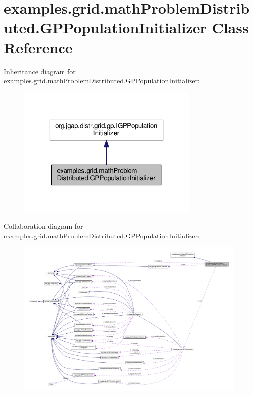 \hypertarget{classexamples_1_1grid_1_1math_problem_distributed_1_1_g_p_population_initializer}{\section{examples.\-grid.\-math\-Problem\-Distributed.\-G\-P\-Population\-Initializer Class Reference}
\label{classexamples_1_1grid_1_1math_problem_distributed_1_1_g_p_population_initializer}
}


Inheritance diagram for examples.\-grid.\-math\-Problem\-Distributed.\-G\-P\-Population\-Initializer\-:
\nopagebreak
\begin{figure}[H]
\begin{center}
\leavevmode
\includegraphics[width=250pt]{classexamples_1_1grid_1_1math_problem_distributed_1_1_g_p_population_initializer__inherit__graph}
\end{center}
\end{figure}


Collaboration diagram for examples.\-grid.\-math\-Problem\-Distributed.\-G\-P\-Population\-Initializer\-:
\nopagebreak
\begin{figure}[H]
\begin{center}
\leavevmode
\includegraphics[width=350pt]{classexamples_1_1grid_1_1math_problem_distributed_1_1_g_p_population_initializer__coll__graph}
\end{center}
\end{figure}
